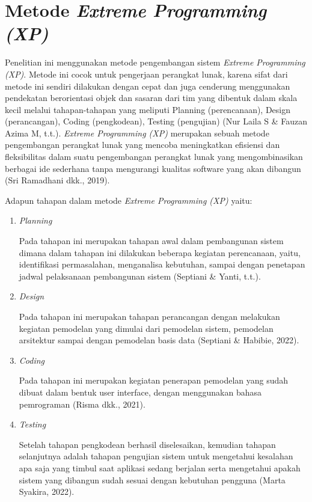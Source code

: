 
\section{Metode \textit{Extreme Programming (XP)}}
\par Penelitian ini menggunakan metode pengembangan sistem \textit{Extreme Programming (XP)}. Metode ini cocok untuk pengerjaan perangkat lunak, karena sifat dari metode ini sendiri dilakukan dengan cepat dan juga cenderung menggunakan pendekatan berorientasi objek dan sasaran dari tim yang dibentuk dalam skala kecil melalui tahapan-tahapan yang meliputi Planning (perencanaan), Design (perancangan), Coding (pengkodean), Testing (pengujian) (Nur Laila S \& Fauzan Azima M, t.t.). 
\textit{Extreme Programming (XP)} merupakan sebuah metode pengembangan perangkat lunak yang mencoba meningkatkan efisiensi dan fleksibilitas dalam suatu pengembangan perangkat lunak yang mengombinasikan berbagai ide sederhana tanpa mengurangi kualitas software yang akan dibangun (Sri Ramadhani dkk., 2019).

\par Adapun tahapan dalam metode \textit{Extreme Programming (XP)} yaitu:

		\begin{enumerate}
			\item \textit{Planning}
			\par Pada tahapan ini merupakan tahapan awal dalam pembangunan sistem dimana dalam tahapan ini dilakukan beberapa kegiatan perencanaan, yaitu, identifikasi permasalahan, menganalisa kebutuhan, sampai dengan penetapan jadwal pelaksanaan pembangunan sistem (Septiani \& Yanti, t.t.).
			\item \textit{Design}
			\par Pada tahapan ini merupakan tahapan perancangan dengan melakukan kegiatan pemodelan yang dimulai dari pemodelan sistem, pemodelan arsitektur sampai dengan pemodelan basis data (Septiani \& Habibie, 2022).
			\item \textit{Coding}
			\par Pada tahapan ini merupakan kegiatan penerapan pemodelan yang sudah dibuat dalam bentuk user interface, dengan menggunakan bahasa pemrograman (Risma dkk., 2021).
			\item \textit{Testing}
			\par Setelah tahapan pengkodean berhasil diselesaikan, kemudian tahapan selanjutnya adalah tahapan pengujian sistem untuk mengetahui kesalahan apa saja yang timbul saat aplikasi sedang berjalan serta mengetahui apakah sistem yang dibangun sudah sesuai dengan kebutuhan pengguna (Marta Syakira, 2022).
		\end{enumerate}
